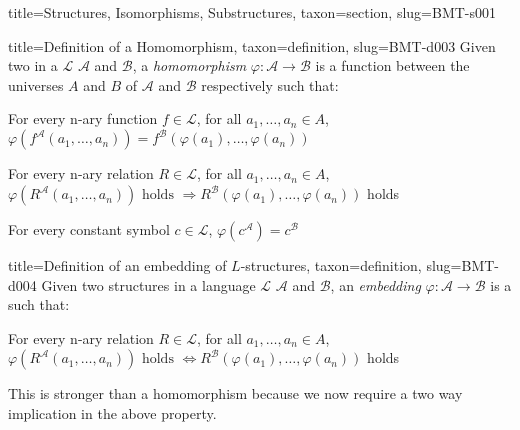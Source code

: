 \documentclass[a4paper]{article}
\begin{document}
\begin{tree}{title={Structures, Isomorphisms, Substructures}, taxon={section}, slug={BMT-s001}}
\begin{tree}{title={Definition of a Homomorphism}, taxon={definition}, slug={BMT-d003}}
Given two  in a  \(\mathcal {L}\) \(\mathcal {A}\) and \(\mathcal {B}\), a \emph{homomorphism} \(\varphi :  \mathcal {A}  \rightarrow   \mathcal {B}\)
is a function between the universes \(A\) and \(B\) of \(\mathcal {A}\) and \(\mathcal {B}\) respectively such that:\par{ For every n-ary function \(f \in   \mathcal {L}\), for all \(a_1, \dots , a_n \in  A\), \(\varphi (f^{ \mathcal {A}}(a_1, \dots , a_n)) = f^{ \mathcal {B}}( \varphi (a_1), \dots ,  \varphi (a_n))\)}\par{For every n-ary relation \(R \in   \mathcal {L}\), for all \(a_1, \dots , a_n  \in  A\), \(\varphi (R^{ \mathcal {A}}(a_1, \dots , a_n))  \text { holds }  \Rightarrow  R^{ \mathcal {B}}( \varphi (a_1),  \dots ,  \varphi (a_n))\) holds}\par{For every constant symbol \(c  \in   \mathcal {L}\), \(\varphi (c^{ \mathcal {A}}) =c^{ \mathcal {B}}\)}
\end{tree}

\begin{tree}{title={Definition of an embedding of \(L\)-structures}, taxon={definition}, slug={BMT-d004}}
Given two structures in a language \(\mathcal {L}\) \(\mathcal {A}\) and \(\mathcal {B}\), an \emph{embedding} \(\varphi :  \mathcal {A}  \rightarrow   \mathcal {B}\)
is a  such that:\par{For every n-ary relation \(R \in   \mathcal {L}\), for all \(a_1, \dots , a_n  \in  A\), \(\varphi (R^{ \mathcal {A}}(a_1, \dots , a_n))  \text { holds }  \Leftrightarrow  R^{ \mathcal {B}}( \varphi (a_1),  \dots ,  \varphi (a_n))\) holds}\par{This is stronger than a homomorphism because we now require a two way implication in the above property.}
\end{tree}

\end{tree}

\printbibliography
\end{document}
